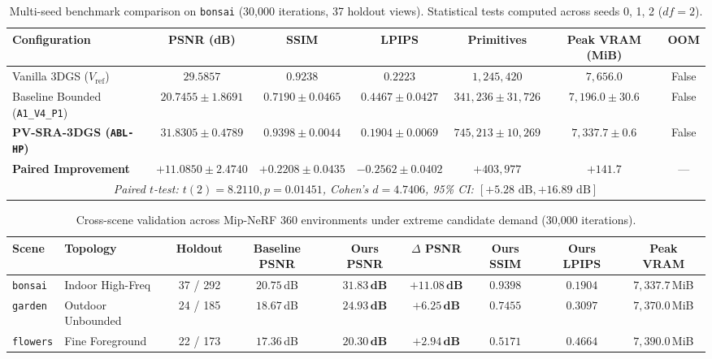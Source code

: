 \documentclass[10pt,twocolumn,letterpaper]{article}
\begin{document}
\begin{table}[t]
\centering
\small
\caption{Multi-seed benchmark comparison on \texttt{bonsai} (30,000 iterations, 37 holdout views). Statistical tests computed across seeds 0, 1, 2 ($df=2$).}
\label{tab:multiseed}
\begin{tabular}{lcccccc}
\toprule
\textbf{Configuration} & \textbf{PSNR (dB)} & \textbf{SSIM} & \textbf{LPIPS} & \textbf{Primitives} & \textbf{Peak VRAM (MiB)} & \textbf{OOM} \\
\midrule
Vanilla 3DGS ($V_{\text{ref}}$) & $29.5857$ & $0.9238$ & $0.2223$ & $1{,}245{,}420$ & $7{,}656.0$ & False \\
Baseline Bounded (\texttt{A1\_V4\_P1}) & $20.7455 \pm 1.8691$ & $0.7190 \pm 0.0465$ & $0.4467 \pm 0.0427$ & $341{,}236 \pm 31{,}726$ & $7{,}196.0 \pm 30.6$ & False \\
\textbf{PV-SRA-3DGS (\texttt{ABL-HP})} & $\mathbf{31.8305 \pm 0.4789}$ & $\mathbf{0.9398 \pm 0.0044}$ & $\mathbf{0.1904 \pm 0.0069}$ & $745{,}213 \pm 10{,}269$ & $7{,}337.7 \pm 0.6$ & False \\
\midrule
\textbf{Paired Improvement} & $\mathbf{+11.0850 \pm 2.4740}$ & $\mathbf{+0.2208 \pm 0.0435}$ & $\mathbf{-0.2562 \pm 0.0402}$ & $+403{,}977$ & $+141.7$ & --- \\
\multicolumn{7}{c}{\textit{Paired $t$-test: $t(2) = 8.2110, p = 0.01451$, Cohen's $d = 4.7406$, 95\% CI: $[+5.28\text{ dB}, +16.89\text{ dB}]$}} \\
\bottomrule
\end{tabular}
\end{table}

\begin{table}[t]
\centering
\small
\caption{Cross-scene validation across Mip-NeRF 360 environments under extreme candidate demand (30,000 iterations).}
\label{tab:cross_scene}
\begin{tabular}{llccccccc}
\toprule
\textbf{Scene} & \textbf{Topology} & \textbf{Holdout} & \textbf{Baseline PSNR} & \textbf{Ours PSNR} & \textbf{$\Delta$ PSNR} & \textbf{Ours SSIM} & \textbf{Ours LPIPS} & \textbf{Peak VRAM} \\
\midrule
\texttt{bonsai} & Indoor High-Freq & 37 / 292 & $20.75$\,dB & $\mathbf{31.83\,dB}$ & $\mathbf{+11.08\,dB}$ & $\mathbf{0.9398}$ & $\mathbf{0.1904}$ & $7{,}337.7$\,MiB \\
\texttt{garden} & Outdoor Unbounded & 24 / 185 & $18.67$\,dB & $\mathbf{24.93\,dB}$ & $\mathbf{+6.25\,dB}$ & $\mathbf{0.7455}$ & $\mathbf{0.3097}$ & $7{,}370.0$\,MiB \\
\texttt{flowers} & Fine Foreground & 22 / 173 & $17.36$\,dB & $\mathbf{20.30\,dB}$ & $\mathbf{+2.94\,dB}$ & $\mathbf{0.5171}$ & $\mathbf{0.4664}$ & $7{,}390.0$\,MiB \\
\bottomrule
\end{tabular}
\end{table}
\end{document}
